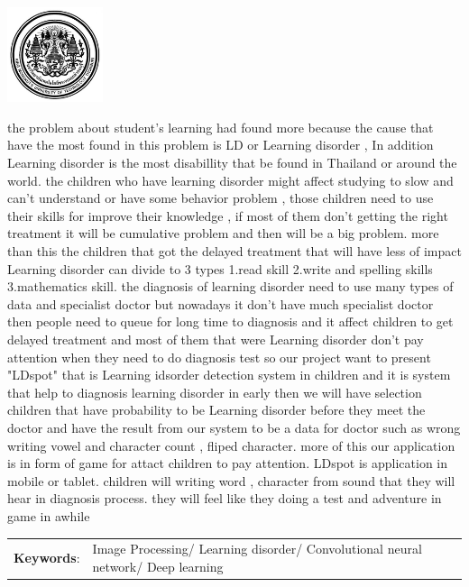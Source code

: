 \documentclass[12pt,oneside,openright,a4paper]{cpe-thai-project}
\begin{document}
\pdfstringdefDisableCommands{%
\let\MakeUppercase\relax
}
\begin{center}
\includegraphics[width=2.8cm]{logo02.jpg}
\end{center}
\vspace*{-1cm}
\maketitlepage
\makesignaturepage 

\abstract

the problem about student's learning had found more because the cause that have the most found
 in this problem is LD or Learning disorder , In addition Learning disorder is the most disabillity that be found in Thailand
or around the world. the children who have learning disorder might affect studying to slow and can't understand or have some
behavior problem , those children need to use their skills for improve their knowledge , if most of them don't getting the right treatment 
it will be cumulative problem and then will be a big problem. more than this the children that got the delayed treatment that will have less of impact 
    Learning disorder can divide to 3 types 1.read skill 2.write and spelling skills 3.mathematics skill. the diagnosis of learning disorder need to use 
many types of data and specialist doctor  but nowadays it don't have much specialist doctor then people need to queue for long time to diagnosis and it affect 
children to get delayed treatment and most of them that were Learning disorder don't pay attention when they need to do diagnosis test 
    so our project want to present "LDspot" that is Learning idsorder detection system in children and it is system that help to diagnosis learning disorder in early 
then we will have selection children that have probability to be Learning disorder before they meet the doctor and have the result from our system to be a data for doctor
such as wrong writing vowel and character count , fliped character. more of this our application is in form of game for attact children to pay attention. LDspot is application in 
mobile or tablet. children will writing word , character from sound that they will hear in diagnosis process. they will feel like they doing a test and adventure in game in awhile
\begin{flushleft}
\begin{tabular*}{\textwidth}{@{}lp{}}
\textbf{Keywords}: & Image Processing/ Learning disorder/ Convolutional neural network/ Deep learning
\end{tabular*}
\end{flushleft}
\endabstract
\end{document}
